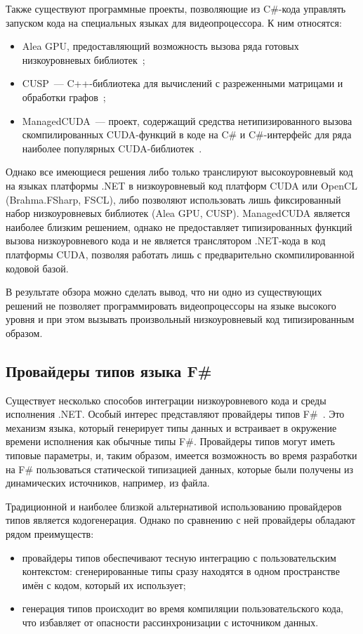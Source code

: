 Также существуют программные проекты, позволяющие из C\#-кода управлять запуском кода на специальных языках для видеопроцессора. К ним относятся:
\begin{itemize}
    \item Alea GPU, предоставляющий возможность вызова ряда готовых низкоуровневых библиотек~\cite{AleaGPU};
    \item CUSP~--- C++-библиотека для вычислений с разреженными матрицами и обработки графов~\cite{CUSP};
    \item ManagedCUDA~--- проект, содержащий средства нетипизированного вызова скомпилированных CUDA-функций в коде на C\# и C\#-интерфейс для ряда наиболее популярных CUDA-библиотек~\cite{ManagedCUDA}.
\end{itemize}

Однако все имеющиеся решения либо только транслируют высокоуровневый код на языках платформы .NET в низкоуровневый код платформ CUDA или OpenCL (Brahma.FSharp, FSCL), либо позволяют использовать лишь фиксированный набор низкоуровневых библиотек (Alea GPU, CUSP). ManagedCUDA является наиболее близким решением, однако не предоставляет типизированных функций вызова низкоуровневого кода и не является транслятором .NET-кода в код платформы CUDA, позволяя работать лишь с предварительно скомпилированной кодовой базой.

В результате обзора можно сделать вывод, что ни одно из существующих решений не позволяет программировать видеопроцессоры на языке высокого уровня и при этом вызывать произвольный низкоуровневый код типизированным образом.

\subsection{Провайдеры типов языка F\#}
Существует несколько способов интеграции низкоуровневого кода и среды исполнения .NET. Особый интерес представляют провайдеры типов F\#~\cite{TypeProviders}. Это механизм языка, который генерирует типы данных и встраивает в окружение времени исполнения как обычные типы F\#. Провайдеры типов могут иметь типовые параметры, и, таким образом, имеется возможность во время разработки на F\# пользоваться статической типизацией данных, которые были получены из динамических источников, например, из файла.

Традиционной и наиболее близкой альтернативой использованию провайдеров типов является кодогенерация. Однако по сравнению с ней провайдеры обладают рядом преимуществ:
\begin{itemize}
    \item провайдеры типов обеспечивают тесную интеграцию с пользовательским контекстом: сгенерированные типы сразу находятся в одном пространстве имён с кодом, который их использует;
    \item генерация типов происходит во время компиляции пользовательского кода, что избавляет от опасности рассинхронизации с источником данных.
\end{itemize}

